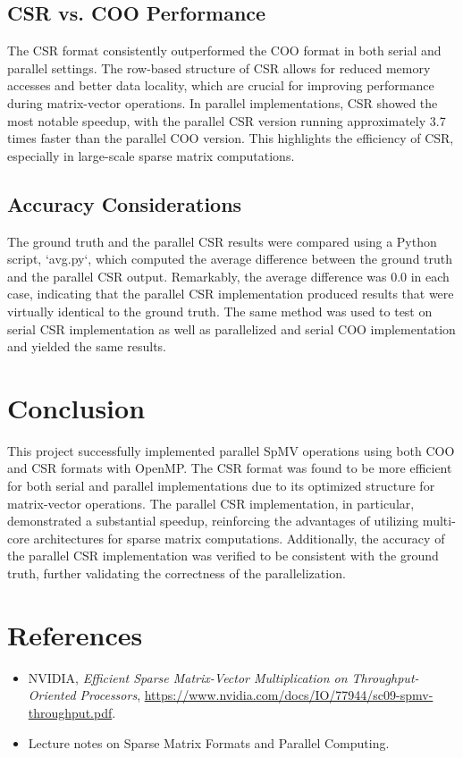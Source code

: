 \documentclass[12pt]{article}
\begin{document}
\subsection{CSR vs. COO Performance}
The CSR format consistently outperformed the COO format in both serial and parallel settings. The row-based structure of CSR allows for reduced memory accesses and better data locality, which are crucial for improving performance during matrix-vector operations. In parallel implementations, CSR showed the most notable speedup, with the parallel CSR version running approximately 3.7 times faster than the parallel COO version. This highlights the efficiency of CSR, especially in large-scale sparse matrix computations.

\subsection{Accuracy Considerations}
The ground truth and the parallel CSR results were compared using a Python script, `avg.py`, which computed the average difference between the ground truth and the parallel CSR output. Remarkably, the average difference was 0.0 in each case, indicating that the parallel CSR implementation produced results that were virtually identical to the ground truth. The same method was used to test on serial CSR implementation as well as parallelized and serial COO implementation and yielded the same results.

\section{Conclusion}
This project successfully implemented parallel SpMV operations using both COO and CSR formats with OpenMP. The CSR format was found to be more efficient for both serial and parallel implementations due to its optimized structure for matrix-vector operations. The parallel CSR implementation, in particular, demonstrated a substantial speedup, reinforcing the advantages of utilizing multi-core architectures for sparse matrix computations. Additionally, the accuracy of the parallel CSR implementation was verified to be consistent with the ground truth, further validating the correctness of the parallelization.

\section{References}
\begin{itemize}
    \item NVIDIA, \textit{Efficient Sparse Matrix-Vector Multiplication on Throughput-Oriented Processors}, \url{https://www.nvidia.com/docs/IO/77944/sc09-spmv-throughput.pdf}.
    \item Lecture notes on Sparse Matrix Formats and Parallel Computing.
\end{itemize}
\end{document}
